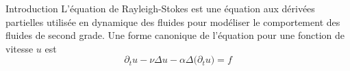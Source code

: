 \begin{frame}{Introduction}
L'équation de Rayleigh-Stokes est une équation aux dérivées 
partielles utilisée en dynamique des fluides pour modéliser le 
comportement des 
fluides de second grade. Une forme canonique de l'équation pour 
une fonction de vitesse $u$ est
\begin{equation*}
    \partial_t u - \nu \Delta u - \alpha \Delta \big(\partial_t u\big) = f
\end{equation*}
\end{frame}